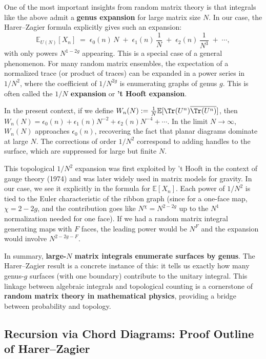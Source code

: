 \documentclass[letterpaper,11pt,oneside,reqno]{article}
\numberwithin{equation}{section}
\theoremstyle{definition}
\begin{document}
One of the most important insights from random matrix theory is that integrals like the above admit a \textbf{genus expansion} for large matrix size $N$. In our case, the Harer–Zagier formula explicitly gives such an expansion:
\[ \mathbb{E}_{U(N)}[X_n] \;=\; \epsilon_0(n)\,N \;+\; \epsilon_1(n)\,\frac{1}{N} \;+\; \epsilon_2(n)\,\frac{1}{N^3} \;+\; \cdots, \]
with only powers $N^{1-2g}$ appearing. This is a special case of a general phenomenon. For many random matrix ensembles, the expectation of a normalized trace (or product of traces) can be expanded in a power series in $1/N^2$, where the coefficient of $1/N^{2g}$ is enumerating graphs of genus $g$. This is often called the \textbf{$1/N$ expansion} or \textbf{'t Hooft expansion}.

In the present context, if we define $W_n(N) := \frac{1}{N}\mathbb{E}[\Tr(U^n)\overline{\Tr(U^n)}]$, then $W_n(N) = \epsilon_0(n) + \epsilon_1(n)N^{-2} + \epsilon_2(n)N^{-4} + \cdots$. In the limit $N\to\infty$, $W_n(N)$ approaches $\epsilon_0(n)$, recovering the fact that planar diagrams dominate at large $N$. The corrections of order $1/N^2$ correspond to adding handles to the surface, which are suppressed for large but finite $N$.

This topological $1/N^2$ expansion was first exploited by 't Hooft in the context of gauge theory (1974) and was later widely used in matrix models for gravity. In our case, we see it explicitly in the formula for $\mathbb{E}[X_n]$. Each power of $1/N^2$ is tied to the Euler characteristic of the ribbon graph (since for a one-face map, $\chi = 2-2g$, and the contribution goes like $N^{\chi} = N^{2-2g}$ up to the $N^1$ normalization needed for one face). If we had a random matrix integral generating maps with $F$ faces, the leading power would be $N^F$ and the expansion would involve $N^{2-2g - F}$.

In summary, \textbf{large-$N$ matrix integrals enumerate surfaces by genus}. The Harer–Zagier result is a concrete instance of this: it tells us exactly how many genus-$g$ surfaces (with one boundary) contribute to the unitary integral. This linkage between algebraic integrals and topological counting is a cornerstone of \textbf{random matrix theory in mathematical physics}, providing a bridge between probability and topology.

\subsection*{Recursion via Chord Diagrams: Proof Outline of Harer–Zagier}
\end{document}
